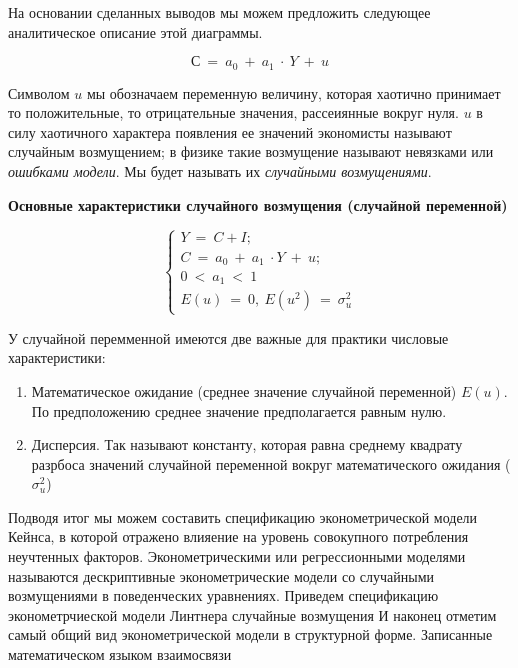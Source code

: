 \documentclass[12pt,a4paper]{article}
\begin{document}
На основании сделанных выводов мы можем предложить следующее аналитическое описание этой диаграммы.

\begin{equation*}
С\ =\ a_{0} \ +\ a_{1} \ \cdot \ Y\ +\ u
\end{equation*}

Символом $u$ мы обозначаем переменную величину, которая хаотично принимает то положительные, то отрицательные значения, рассеиянные вокруг нуля.
$u$ в силу хаотичного характера появления ее значений экономисты называют случайным возмущением; в физике такие возмущение называют невязками или \textit{ошибками модели}. Мы будет называть их \textit{случайными возмущениями}.
\begin{center}
\textbf{Основные характеристики случайного возмущения (случайной переменной)}
\end{center}


\begin{equation*}
\begin{cases}
Y\ =\ C+I;\\
C\ =\ a_{0} \ +\ a_{1} \ \cdot Y\ +\ u;\\
0\ < \ a_{1} \ < \ 1\\
E( u) \ =\ 0,\ E\left( u^{2}\right) \ =\ \sigma ^{2}_{u}
\end{cases}
\end{equation*}

У случайной перемменной имеются две важные для практики числовые характеристики:
\begin{enumerate}
\item Математическое ожидание (среднее значение случайной переменной) $E(u)$. По предположению среднее значение предполагается равным нулю.
\item Дисперсия. Так называют константу, которая равна среднему квадрату разрбоса значений случайной переменной вокруг математического ожидания ($\sigma^2_u$)
\end{enumerate}
Подводя итог мы можем составить спецификацию эконометрической модели Кейнса, в которой отражено влияение на уровень совокупного потребления неучтенных факторов. Эконометрическими или регрессионными моделями называются дескриптивные эконометрические модели со случайными возмущениями в поведенческих уравнениях.
Приведем спецификацию эконометрчиеской модели Линтнера
случайные возмущения
И наконец отметим самый общий вид эконометрической модели в структурной форме.
Записанные математическом языком взаимосвязи 
\end{document}
